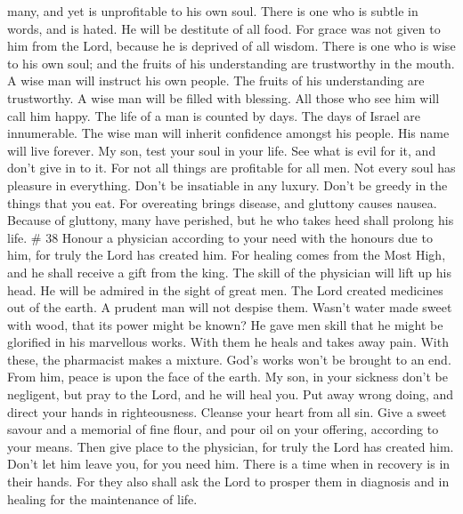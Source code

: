 many, and yet is unprofitable to his own soul.  There is
one who is subtle in words, and is hated. He will be destitute of all
food.  For grace was not given to him from the Lord,
because he is deprived of all wisdom.  There is one who is
wise to his own soul; and the fruits of his understanding are
trustworthy in the mouth.  A wise man will instruct his own
people. The fruits of his understanding are trustworthy.  A
wise man will be filled with blessing. All those who see him will call
him happy.  The life of a man is counted by days. The days
of Israel are innumerable.  The wise man will inherit
confidence amongst his people. His name will live forever. 
My son, test your soul in your life. See what is evil for it, and don't
give in to it.  For not all things are profitable for all
men. Not every soul has pleasure in everything.  Don't be
insatiable in any luxury. Don't be greedy in the things that you eat.
 For overeating brings disease, and gluttony causes nausea.
 Because of gluttony, many have perished, but he who takes
heed shall prolong his life. \# 38  Honour a physician
according to your need with the honours due to him, for truly the Lord
has created him.  For healing comes from the Most High, and
he shall receive a gift from the king.  The skill of the
physician will lift up his head. He will be admired in the sight of
great men.  The Lord created medicines out of the earth. A
prudent man will not despise them.  Wasn't water made sweet
with wood, that its power might be known?  He gave men skill
that he might be glorified in his marvellous works.  With
them he heals and takes away pain.  With these, the
pharmacist makes a mixture. God's works won't be brought to an end. From
him, peace is upon the face of the earth.  My son, in your
sickness don't be negligent, but pray to the Lord, and he will heal you.
 Put away wrong doing, and direct your hands in
righteousness. Cleanse your heart from all sin.  Give a
sweet savour and a memorial of fine flour, and pour oil on your
offering, according to your means.  Then give place to the
physician, for truly the Lord has created him. Don't let him leave you,
for you need him.  There is a time when in recovery is in
their hands.  For they also shall ask the Lord to prosper
them in diagnosis and in healing for the maintenance of life.

